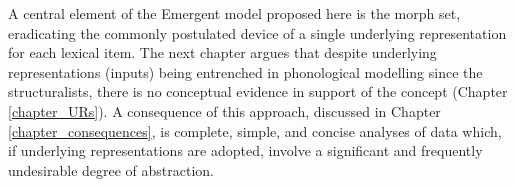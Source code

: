 A central element of the Emergent model proposed here is the morph set, eradicating the commonly postulated device of a single underlying representation for each lexical item. The next chapter argues that despite underlying representations (inputs) being entrenched in phonological modelling since the structuralists, there is no conceptual evidence in support of the concept (Chapter \ref{chapter_URs}). A consequence of this approach, discussed in Chapter \ref{chapter_consequences}, is complete, simple, and concise analyses of data which, if underlying representations are adopted, involve a significant and frequently undesirable degree of abstraction.
